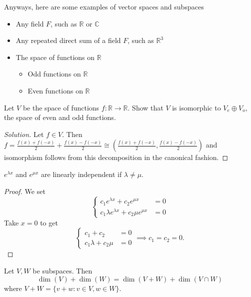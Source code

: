 Anyways, here are some examples of vector spaces and subspaces
\begin{itemize}
\item Any field $F$, such as $\mathbb{R}$ or $\mathbb{C}$
\item Any repeated direct sum of a field $F$, such as $\mathbb{R}^3$
\item The space of functions on $\mathbb{R}$
\begin{itemize}
\item Odd functions on $\mathbb{R}$
\item Even functions on $\mathbb{R}$
\end{itemize}
\end{itemize}

\begin{prb}
Let $V$ be the space of functions $f : \mathbb{R} \rightarrow
\mathbb{R}$. Show that $V$ is isomorphic to $V_e \oplus V_o$, the space
of even and odd functions.
\end{prb}

\begin{proof}[Solution]
Let $f \in V$. Then $f = \frac{f(x) + f(-x)}{2} + \frac{f(x) -
f(-x)}{2} \cong \left(\frac{f(x) + f(-x)}{2}, \frac{f(x) -
f(-x)}{2}\right)$ and isomorphism follows from this decomposition in the
canonical fashion.
\end{proof}

\begin{prop}
$e^{\lambda x}$ and $e^{\mu x}$ are linearly independent if $\lambda
\neq \mu$.
\end{prop}

\begin{proof}
We set
\[ \left\lbrace \begin{aligned}
c_1 e^{\lambda x} + c_2 e^{\mu x} &= 0 \\
c_1 \lambda e^{\lambda x} + c_2 \mu e^{\mu x} &= 0
\end{aligned} \right. \]
Take $x = 0$ to get
\[ \left\lbrace \begin{aligned}
c_1 + c_2 &= 0 \\
c_1 \lambda + c_2 \mu &= 0
\end{aligned} \right. \implies c_1 = c_2 = 0. \]
\end{proof}

\begin{prop}
Let $V, W$ be subspaces. Then
\[ \dim(V) + \dim(W) = \dim(V + W) + \dim(V \cap W) \]
where $V + W = \lbrace v + w : v \in V, w \in W \rbrace$.
\end{prop}

